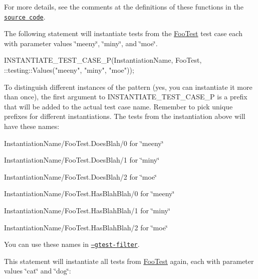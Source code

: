 For more details, see the comments at the definitions of these functions in the \href{../include/gtest/gtest-param-test.h}{\tt source code}.

The following statement will instantiate tests from the {\ttfamily \mbox{\hyperlink{class_foo_test}{Foo\+Test}}} test case each with parameter values {\ttfamily \char`\"{}meeny\char`\"{}}, {\ttfamily \char`\"{}miny\char`\"{}}, and {\ttfamily \char`\"{}moe\char`\"{}}.


\begin{DoxyCode}
INSTANTIATE\_TEST\_CASE\_P(InstantiationName,
                        FooTest,
                        ::testing::Values("meeny", "miny", "moe"));
\end{DoxyCode}


To distinguish different instances of the pattern (yes, you can instantiate it more than once), the first argument to {\ttfamily I\+N\+S\+T\+A\+N\+T\+I\+A\+T\+E\+\_\+\+T\+E\+S\+T\+\_\+\+C\+A\+S\+E\+\_\+P} is a prefix that will be added to the actual test case name. Remember to pick unique prefixes for different instantiations. The tests from the instantiation above will have these names\+:


\begin{DoxyItemize}
\item {\ttfamily Instantiation\+Name/\+Foo\+Test.\+Does\+Blah/0} for {\ttfamily \char`\"{}meeny\char`\"{}}
\item {\ttfamily Instantiation\+Name/\+Foo\+Test.\+Does\+Blah/1} for {\ttfamily \char`\"{}miny\char`\"{}}
\item {\ttfamily Instantiation\+Name/\+Foo\+Test.\+Does\+Blah/2} for {\ttfamily \char`\"{}moe\char`\"{}}
\item {\ttfamily Instantiation\+Name/\+Foo\+Test.\+Has\+Blah\+Blah/0} for {\ttfamily \char`\"{}meeny\char`\"{}}
\item {\ttfamily Instantiation\+Name/\+Foo\+Test.\+Has\+Blah\+Blah/1} for {\ttfamily \char`\"{}miny\char`\"{}}
\item {\ttfamily Instantiation\+Name/\+Foo\+Test.\+Has\+Blah\+Blah/2} for {\ttfamily \char`\"{}moe\char`\"{}}
\end{DoxyItemize}

You can use these names in \href{#running-a-subset-of-the-tests}{\tt --gtest-\/filter}.

This statement will instantiate all tests from {\ttfamily \mbox{\hyperlink{class_foo_test}{Foo\+Test}}} again, each with parameter values {\ttfamily \char`\"{}cat\char`\"{}} and {\ttfamily \char`\"{}dog\char`\"{}}\+:



